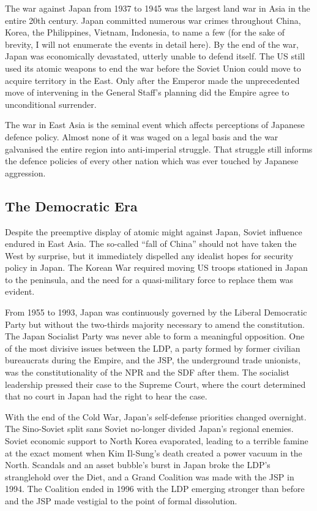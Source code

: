 \documentclass[letterpaper,12pt,twoside]{article} %
\begin{document}
\begin{multicols}{2}
The war against Japan from 1937 to 1945 was the largest land war in Asia in the entire 20th century. Japan committed numerous war crimes throughout China, Korea, the Philippines, Vietnam, Indonesia, to name a few (for the sake of brevity, I will not enumerate the events in detail here). By the end of the war, Japan was economically devastated, utterly unable to defend itself. The US still used its atomic weapons to end the war before the Soviet Union could move to acquire territory in the East. Only after the Emperor made the unprecedented move of intervening in the General Staff's planning did the Empire agree to unconditional surrender.

The war in East Asia is the seminal event which affects perceptions of Japanese defence policy. Almost none of it was waged on a legal basis and the war galvanised the entire region into anti-imperial struggle. That struggle still informs the defence policies of every other nation which was ever touched by Japanese aggression.

\subsection{The Democratic Era}

Despite the preemptive display of atomic might against Japan, Soviet influence endured in East Asia. The so-called ``fall of China'' should not have taken the West by surprise, but it immediately dispelled any idealist hopes for security policy in Japan. The Korean War required moving US troops stationed in Japan to the peninsula, and the need for a quasi-military force to replace them was evident.

From 1955 to 1993, Japan was continuously governed by the Liberal Democratic Party but without the two-thirds majority necessary to amend the constitution. The Japan Socialist Party was never able to form a meaningful opposition. One of the most divisive issues between the LDP, a party formed by former civilian bureaucrats during the Empire, and the JSP, the underground trade unionists, was the constitutionality of the NPR and the SDF after them.\autocite[55]{sissons1961pacifist} The socialist leadership pressed their case to the Supreme Court, where the court determined that no court in Japan had the right to hear the case.

With the end of the Cold War, Japan's self-defense priorities changed overnight. The Sino-Soviet split sans Soviet no-longer divided Japan's regional enemies. Soviet economic support to North Korea evaporated, leading to a terrible famine at the exact moment when Kim Il-Sung's death created a power vacuum in the North. Scandals and an asset bubble's burst in Japan broke the LDP's stranglehold over the Diet, and a Grand Coalition was made with the JSP in 1994. The Coalition ended in 1996 with the LDP emerging stronger than before and the JSP made vestigial to the point of formal dissolution.


\end{multicols}
\end{document}
